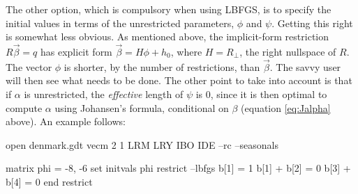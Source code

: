 The other option, which is compulsory when using LBFGS, is to specify
the initial values in terms of the unrestricted parameters, $\phi$ and
$\psi$.  Getting this right is somewhat less obvious.  As mentioned
above, the implicit-form restriction $R\vec{\beta} = q$ has explicit
form $\vec{\beta} = H\phi + h_0$, where $H = R_{\perp}$, the right
nullspace of $R$.  The vector $\phi$ is shorter, by the number of
restrictions, than $\vec{\beta}$.  The savvy user will then see what
needs to be done.  The other point to take into account is that if
$\alpha$ is unrestricted, the \textit{effective} length of $\psi$ is
0, since it is then optimal to compute $\alpha$ using Johansen's
formula, conditional on $\beta$ (equation \ref{eq:Jalpha} above). An
example follows:
\begin{code}
open denmark.gdt
vecm 2 1 LRM LRY IBO IDE --rc --seasonals

matrix phi = {-8, -6}
set initvals phi
restrict --lbfgs
  b[1] = 1
  b[1] + b[2] = 0
  b[3] + b[4] = 0
end restrict
\end{code}


